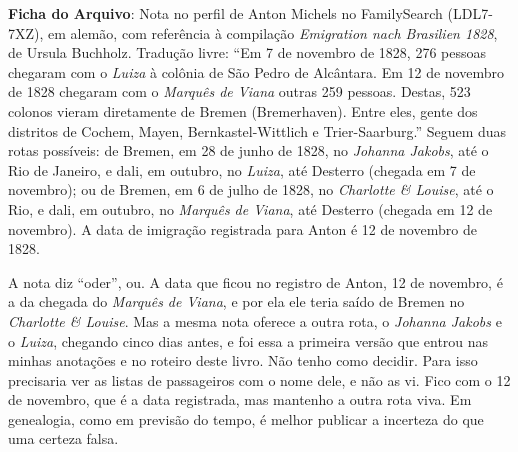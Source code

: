 \documentclass[
  brazilian,
  11pt,
  openany]{book}
\begin{document}
\begin{ficha}

\textbf{Ficha do Arquivo}: Nota no perfil de Anton Michels no
FamilySearch (LDL7-7XZ), em alemão, com referência à compilação
\emph{Emigration nach Brasilien 1828}, de Ursula Buchholz. Tradução
livre: ``Em 7 de novembro de 1828, 276 pessoas chegaram com o
\emph{Luiza} à colônia de São Pedro de Alcântara. Em 12 de novembro de
1828 chegaram com o \emph{Marquês de Viana} outras 259 pessoas. Destas,
523 colonos vieram diretamente de Bremen (Bremerhaven). Entre eles,
gente dos distritos de Cochem, Mayen, Bernkastel-Wittlich e
Trier-Saarburg.'' Seguem duas rotas possíveis: de Bremen, em 28 de junho
de 1828, no \emph{Johanna Jakobs}, até o Rio de Janeiro, e dali, em
outubro, no \emph{Luiza}, até Desterro (chegada em 7 de novembro); ou de
Bremen, em 6 de julho de 1828, no \emph{Charlotte \& Louise}, até o Rio,
e dali, em outubro, no \emph{Marquês de Viana}, até Desterro (chegada em
12 de novembro). A data de imigração registrada para Anton é 12 de
novembro de 1828.

\end{ficha}

A nota diz ``oder'', ou. A data que ficou no registro de Anton, 12 de
novembro, é a da chegada do \emph{Marquês de Viana}, e por ela ele teria
saído de Bremen no \emph{Charlotte \& Louise}. Mas a mesma nota oferece
a outra rota, o \emph{Johanna Jakobs} e o \emph{Luiza}, chegando cinco
dias antes, e foi essa a primeira versão que entrou nas minhas anotações
e no roteiro deste livro. Não tenho como decidir. Para isso precisaria
ver as listas de passageiros com o nome dele, e não as vi. Fico com o 12
de novembro, que é a data registrada, mas mantenho a outra rota viva. Em
genealogia, como em previsão do tempo, é melhor publicar a incerteza do
que uma certeza falsa.
\end{document}
